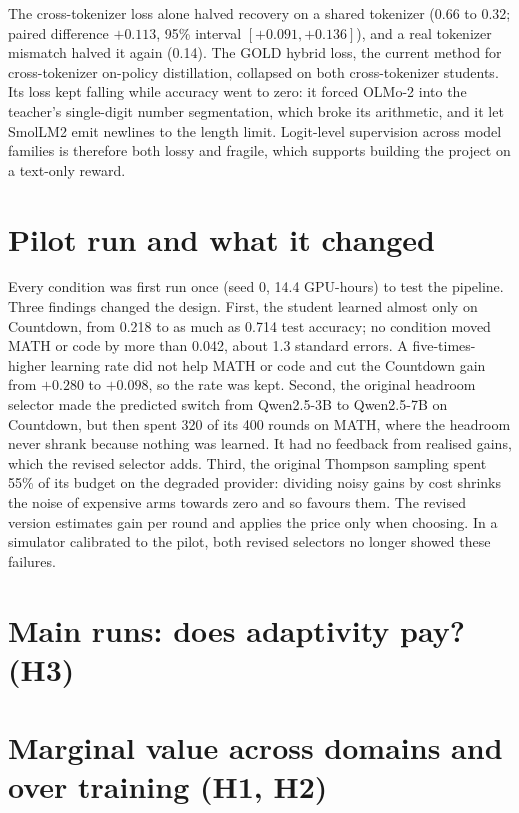The cross-tokenizer loss alone halved recovery on a shared tokenizer (0.66 to 0.32; paired
difference $+0.113$, 95\% interval $[+0.091, +0.136]$), and a real tokenizer mismatch
halved it again (0.14). The GOLD hybrid loss, the current method for cross-tokenizer
on-policy distillation, collapsed on both cross-tokenizer students. Its loss kept falling
while accuracy went to zero: it forced OLMo-2 into the teacher's single-digit number
segmentation, which broke its arithmetic, and it let SmolLM2 emit newlines to the length
limit. Logit-level supervision across model families is therefore both lossy and fragile,
which supports building the project on a text-only reward.

\section{Pilot run and what it changed}
\label{ca:sec:pilot}

Every condition was first run once (seed 0, 14.4 GPU-hours) to test the pipeline. Three
findings changed the design. First, the student learned almost only on Countdown, from
0.218 to as much as 0.714 test accuracy; no condition moved MATH or code by more than
0.042, about 1.3 standard errors. A five-times-higher learning rate did not help MATH or
code and cut the Countdown gain from $+0.280$ to $+0.098$, so the rate was kept. Second,
the original headroom selector made the predicted switch from Qwen2.5-3B to Qwen2.5-7B on
Countdown, but then spent 320 of its 400 rounds on MATH, where the headroom never shrank
because nothing was learned. It had no feedback from realised gains, which the revised
selector adds. Third, the original Thompson sampling spent 55\% of its budget on the
degraded provider: dividing noisy gains by cost shrinks the noise of expensive arms towards
zero and so favours them. The revised version estimates gain per round and applies the
price only when choosing. In a simulator calibrated to the pilot, both revised selectors no
longer showed these failures.

\section{Main runs: does adaptivity pay? (H3)}
\label{ca:sec:h3}



\section{Marginal value across domains and over training (H1, H2)}
\label{ca:sec:h12}

